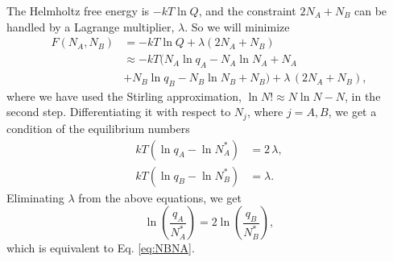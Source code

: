 \documentclass[twocolumn, 10pt]{article}
\numberwithin{equation}{section}
\newenvironment{solution}[1][\empty]
{\par\medskip\sffamily
  \textbf{\ifx\empty#1{Solution.}\relax\else{#1}\fi} \ignorespaces}
{\medskip}
\begin{document}
\begin{solution}
  The Helmholtz free energy is $-kT \ln Q$,
  and the constraint $2 N_A + N_B$ can be handled by a Lagrange multiplier, $\lambda$.
  So we will minimize
  \begin{align*}
  F(N_A, N_B)
    &= -k T \ln Q + \lambda(2 N_A + N_B)
    \\
    &\approx -kT (N_A \ln q_A - N_A \ln N_A + N_A \\
    &
              +   N_B \ln q_B - N_B \ln N_B + N_B)
            + \lambda \, (2 N_A + N_B)
    ,
  \end{align*}
  where we have used the Stirling approximation,
  $\ln N! \approx N\ln N - N$, in the second step.
  Differentiating it with respect to $N_j$, where $j = A, B$,
  we get a condition of the equilibrium numbers
  \begin{align*}
    kT (\ln q_A - \ln N_A^*) &= 2 \, \lambda, \\
    kT (\ln q_B - \ln N_B^*) &= \lambda.
  \end{align*}
  Eliminating $\lambda$ from the above equations, we get
  $$
  \ln\left(\frac{q_A}{N_A^*}\right) = 2 \ln\left(\frac{q_B}{N_B^*}\right),
  $$
  which is equivalent to Eq. \eqref{eq:NBNA}.


\end{solution}
\end{document}
